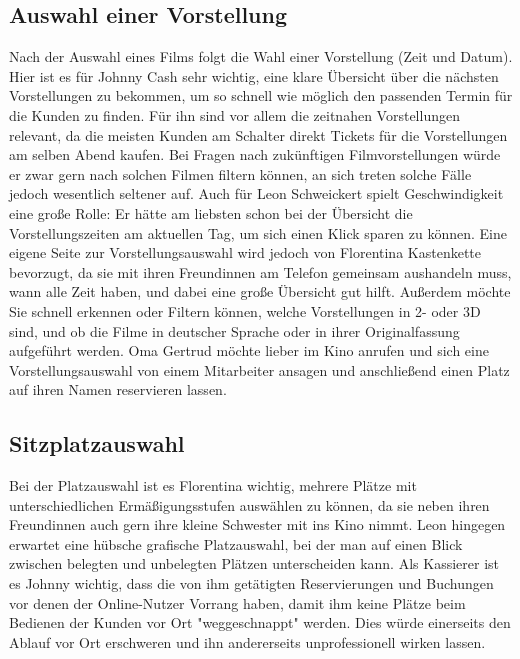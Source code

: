 \subsection{Auswahl einer Vorstellung}
Nach der Auswahl eines Films folgt die Wahl einer Vorstellung (Zeit und Datum). Hier ist es für Johnny Cash sehr wichtig, eine klare Übersicht über die nächsten Vorstellungen zu bekommen, um so schnell wie möglich den passenden Termin für die Kunden zu finden. Für ihn sind vor allem die zeitnahen Vorstellungen relevant, da die meisten Kunden am Schalter direkt Tickets für die Vorstellungen am selben Abend kaufen. Bei Fragen nach zukünftigen Filmvorstellungen würde er zwar gern nach solchen Filmen filtern können, an sich treten solche Fälle jedoch wesentlich seltener auf. Auch für Leon Schweickert spielt Geschwindigkeit eine große Rolle: Er hätte am liebsten schon bei der Übersicht die Vorstellungszeiten am aktuellen Tag, um sich einen Klick sparen zu können. Eine eigene Seite zur Vorstellungsauswahl wird jedoch von Florentina Kastenkette bevorzugt, da sie mit ihren Freundinnen am Telefon gemeinsam aushandeln muss, wann alle Zeit haben, und dabei eine große Übersicht gut hilft. Außerdem möchte Sie schnell erkennen oder Filtern können, welche Vorstellungen in 2- oder 3D sind, und ob die Filme in deutscher Sprache oder in ihrer Originalfassung aufgeführt werden. Oma Gertrud möchte lieber im Kino anrufen und sich eine Vorstellungsauswahl von einem Mitarbeiter ansagen und anschließend einen Platz auf ihren Namen reservieren lassen.

\subsection{Sitzplatzauswahl}
Bei der Platzauswahl ist es Florentina wichtig, mehrere Plätze mit unterschiedlichen Ermäßigungsstufen auswählen zu können, da sie neben ihren Freundinnen auch gern ihre kleine Schwester mit ins Kino nimmt. Leon hingegen erwartet eine hübsche grafische Platzauswahl, bei der man auf einen Blick zwischen belegten und unbelegten Plätzen unterscheiden kann. Als Kassierer ist es Johnny wichtig, dass die von ihm getätigten Reservierungen und Buchungen vor denen der Online-Nutzer Vorrang haben, damit ihm keine Plätze beim Bedienen der Kunden vor Ort "weggeschnappt" werden. Dies würde einerseits den Ablauf vor Ort erschweren und ihn andererseits unprofessionell wirken lassen.

